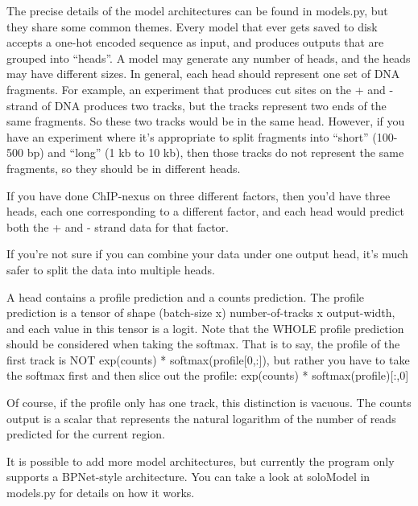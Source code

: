 \documentclass{article}
\begin{document}
The precise details of the model architectures can be found in models.py, but they share some common themes. 
Every model that ever gets saved to disk accepts a one-hot encoded sequence as input, and produces outputs that are grouped into ``heads''. 
A model may generate any number of heads, and the heads may have different sizes. 
In general, each head should represent one set of DNA fragments. For example, an experiment that produces cut sites on the + and - strand of DNA produces
two tracks, but the tracks represent two ends of the same fragments. So these two tracks would be in the same head. 
However, if you have an experiment where it's appropriate to split fragments into ``short'' (100-500 bp) and ``long'' (1 kb to 10 kb), then 
those tracks do not represent the same fragments, so they should be in different heads. 

If you have done ChIP-nexus on three different factors, then you'd have three heads, each one corresponding to a different factor, and each head would predict both the + and - strand data for that factor. 

If you're not sure if you can combine your data under one output head, it's much safer to split the data into multiple heads. 

A head contains a profile prediction and a counts prediction. The profile prediction is a tensor of shape (batch-size x) number-of-tracks x output-width, and each value in this tensor is a logit. 
Note that the WHOLE profile prediction should be considered when taking the softmax. 
That is to say, the profile of the first track is NOT exp(counts) * softmax(profile[0,:]), but rather you have to take the softmax first and then slice out the profile: exp(counts) * softmax(profile)[:,0]

Of course, if the profile only has one track, this distinction is vacuous. 
The counts output is a scalar that represents the natural logarithm of the number of reads predicted for the current region. 

It is possible to add more model architectures, but currently the program only supports a BPNet-style architecture. You can take a look at soloModel in models.py for details on how it works. 
\end{document}
